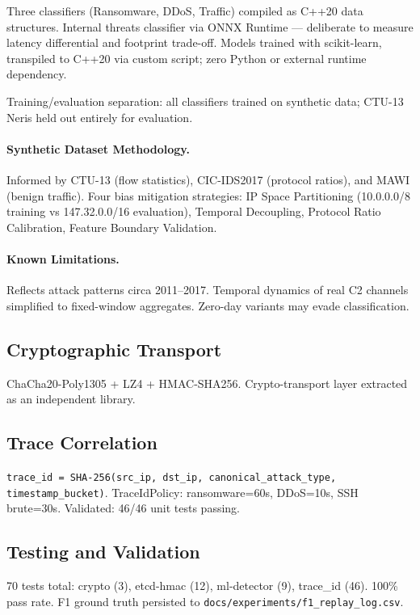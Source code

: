 \documentclass[11pt,a4paper]{article}
\begin{document}
Three classifiers (Ransomware, DDoS, Traffic) compiled as C++20 data structures. Internal
threats classifier via ONNX Runtime --- deliberate to measure latency differential and
footprint trade-off. Models trained with scikit-learn, transpiled to C++20 via custom script;
zero Python or external runtime dependency.

Training/evaluation separation: all classifiers trained on synthetic data; CTU-13 Neris held
out entirely for evaluation.

\paragraph{Synthetic Dataset Methodology.}
Informed by CTU-13 (flow statistics), CIC-IDS2017 (protocol ratios), and MAWI (benign
traffic). Four bias mitigation strategies: IP Space Partitioning (10.0.0.0/8 training vs
147.32.0.0/16 evaluation), Temporal Decoupling, Protocol Ratio Calibration, Feature Boundary
Validation.

\paragraph{Known Limitations.}
Reflects attack patterns circa 2011--2017. Temporal dynamics of real C2 channels simplified
to fixed-window aggregates. Zero-day variants may evade classification.

\subsection{Cryptographic Transport}
ChaCha20-Poly1305 + LZ4 + HMAC-SHA256. Crypto-transport layer extracted as an independent
library.

\subsection{Trace Correlation}

\texttt{trace\_id = SHA-256(src\_ip, dst\_ip, canonical\_attack\_type, timestamp\_bucket)}.
TraceIdPolicy: ransomware=60s, DDoS=10s, SSH brute=30s. Validated: 46/46 unit tests passing.

\subsection{Testing and Validation}

70 tests total: crypto (3), etcd-hmac (12), ml-detector (9), trace\_id (46). 100\% pass
rate. F1 ground truth persisted to \texttt{docs/experiments/f1\_replay\_log.csv}.
\end{document}
